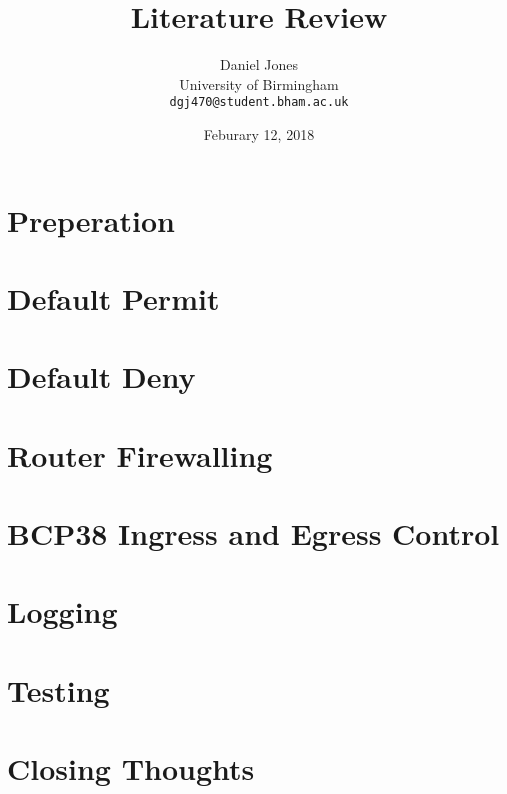 \documentclass[12pt]{article}
\title{Literature Review}
\author{Daniel Jones\\
  \small{University of Birmingham}\\
  \small{\texttt{dgj470@student.bham.ac.uk}}
}
\date{Feburary 12, 2018}
\begin{document}
\maketitle
\tableofcontents
\newpage
\section{Preperation}

\section{Default Permit}
\section{Default Deny}
\section{Router Firewalling}
\section{BCP38 Ingress and Egress Control}
\section{Logging}
\section{Testing}
\section{Closing Thoughts}
\end{document}
